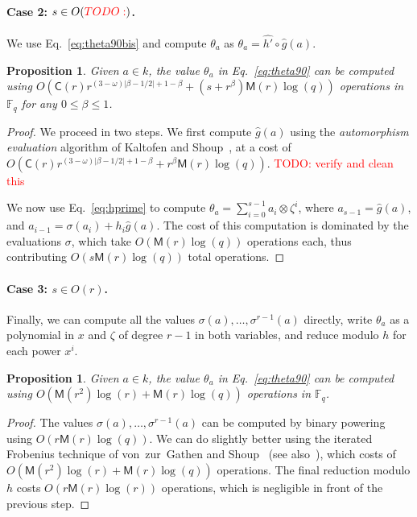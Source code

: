 \documentclass[12pt]{article}
\theoremstyle{plain}
\newtheorem{proposition}[theorem]{Proposition}
\theoremstyle{definition}
\newcommand{\todo}[1]{\textcolor{red}{TODO: #1}}
\def\F{\ensuremath{\mathbb{F}}}
\def\MM{\ensuremath{\mathsf{M}}}
\def\CC{\ensuremath{\mathsf{C}}}
\newcounter{algorithm}
\begin{document}
\paragraph{Case 2: $s\in O(\todo{})$.}
We use Eq.~\eqref{eq:theta90bis} and compute $\theta_a$ as
$\theta_a = \hat{h'}\circ \hat{g} (a)$.
\begin{proposition}
  \label{prop:ks-theta}
  Given $a\in k$, the value $\theta_a$ in Eq.~\eqref{eq:theta90} can
  be computed using
  $O(\CC(r)r^{(3-\omega)\lvert\beta-1/2\rvert+1-\beta}+(s+r^\beta)\MM(r)\log(q))$
  operations in $\F_q$ for any $0\le\beta\le1$.
\end{proposition}
\begin{proof}
  We proceed in two steps. We first compute $\hat{g}(a)$ using the
  \emph{automorphism evaluation} algorithm of Kaltofen and
  Shoup~\cite[Algorithm~AE]{kaltofen+shoup98}, at a cost of
  $O(\CC(r)r^{(3-\omega)\lvert\beta-1/2\rvert+1-\beta}+r^\beta\MM(r)\log(q))$.
  \todo{verify and clean this}
  
  We now use Eq.~\eqref{eq:hprime} to compute
  $\theta_a=\sum_{i=0}^{s-1}a_i\otimes\zeta^i$, where
  $a_{s-1}=\hat{g}(a)$, and $a_{i-1}=\sigma(a_i)+h_i\hat{g}(a)$. %
  The cost of this computation is dominated by the evaluations
  $\sigma$, which take $O(\MM(r)\log(q))$ operations each, thus
  contributing $O(s\MM(r)\log(q))$ total operations.
\end{proof}


\paragraph{Case 3: $s\in O(r)$.}
Finally, we can compute all the values
$\sigma(a),\dots,\sigma^{r-1}(a)$ directly, write $\theta_a$ as a
polynomial in $x$ and $\zeta$ of degree $r-1$ in both variables, and
reduce modulo $h$ for each power $x^i$.

\begin{proposition}
  \label{prop:iter-frob-theta}
  Given $a\in k$, the value $\theta_a$ in Eq.~\eqref{eq:theta90} can
  be computed using $O(\MM(r^2)\log(r) + \MM(r)\log(q))$ operations in
  $\F_q$.
\end{proposition}
\begin{proof}
  The values $\sigma(a),\dots,\sigma^{r-1}(a)$ can be computed by
  binary powering using $O(r\MM(r)\log(q))$. %
  We can do slightly better using the iterated Frobenius technique of
  von~zur~Gathen and Shoup~\cite[Algorithm~3.1]{von1992computing} (see
  also~\cite[Ch.~14.7]{vzGG}), which costs of
  $O(\MM(r^2)\log(r) + \MM(r)\log(q))$ operations. %
  The final reduction modulo $h$ costs $O(r\MM(r)\log(r))$ operations,
  which is negligible in front of the previous step.
\end{proof}
\end{document}
